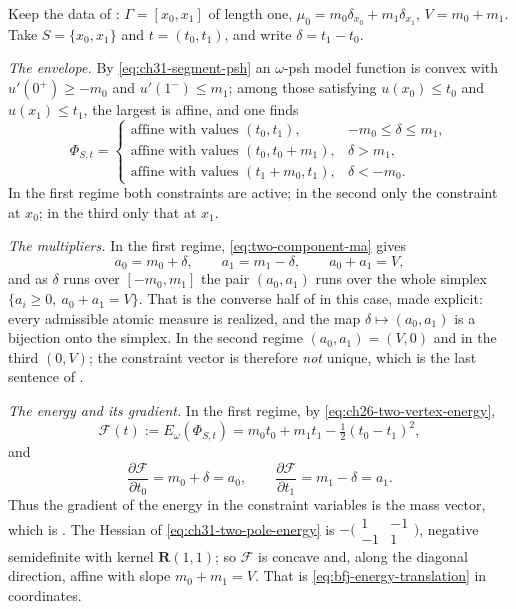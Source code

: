 \begin{example}
\label{ex:ch31-two-pole-programme}
Keep the data of : $\Gamma=[x_0,x_1]$ of
length one, $\mu_0=m_0\delta_{x_0}+m_1\delta_{x_1}$, $V=m_0+m_1$.  Take
$S=\{x_0,x_1\}$ and $t=(t_0,t_1)$, and write $\delta=t_1-t_0$.

\emph{The envelope.}  By \eqref{eq:ch31-segment-psh} an $\omega$-psh model
function is convex with $u'(0^+)\geq-m_0$ and $u'(1^-)\leq m_1$; among
those satisfying $u(x_0)\leq t_0$ and $u(x_1)\leq t_1$, the largest is
affine, and one finds
\begin{equation}
\label{eq:ch31-two-pole-envelope}
 \Phi_{S,t}=
 \begin{cases}
  \text{affine with values }(t_0,t_1), & -m_0\leq\delta\leq m_1,\\
  \text{affine with values }(t_0,t_0+m_1), & \delta>m_1,\\
  \text{affine with values }(t_1+m_0,t_1), & \delta<-m_0 .
 \end{cases}
\end{equation}
In the first regime both constraints are active; in the second only the
constraint at $x_0$; in the third only that at $x_1$.

\emph{The multipliers.}  In the first regime,
\eqref{eq:two-component-ma} gives
\begin{equation}
\label{eq:ch31-two-pole-masses}
 a_0=m_0+\delta,\qquad a_1=m_1-\delta,\qquad a_0+a_1=V ,
\end{equation}
and as $\delta$ runs over $[-m_0,m_1]$ the pair $(a_0,a_1)$ runs over
the whole simplex $\{a_i\geq0,\ a_0+a_1=V\}$.  That is the converse half
of  in this case, made explicit: every
admissible atomic measure is realized, and the map $\delta\mapsto(a_0,a_1)$
is a bijection onto the simplex.  In the second regime
$(a_0,a_1)=(V,0)$ and in the third $(0,V)$; the constraint vector is
therefore \emph{not} unique, which is the last sentence of
.

\emph{The energy and its gradient.}  In the first regime, by
\eqref{eq:ch26-two-vertex-energy},
\begin{equation}
\label{eq:ch31-two-pole-energy}
 \mathcal F(t):=E_\omega(\Phi_{S,t})=m_0t_0+m_1t_1-\tfrac12(t_0-t_1)^2 ,
\end{equation}
and
\[
 \frac{\partial\mathcal F}{\partial t_0}=m_0+\delta=a_0,
 \qquad
 \frac{\partial\mathcal F}{\partial t_1}=m_1-\delta=a_1 .
\]
Thus the gradient of the energy in the constraint variables is the mass
vector, which is .  The Hessian of \eqref{eq:ch31-two-pole-energy}
is
$-\bigl(\begin{smallmatrix}1&-1\\-1&1\end{smallmatrix}\bigr)$, negative
semidefinite with kernel $\mathbf R(1,1)$; so $\mathcal F$ is concave and, along
the diagonal direction, affine with slope $m_0+m_1=V$.  That is
\eqref{eq:bfj-energy-translation} in coordinates.


\end{example}
